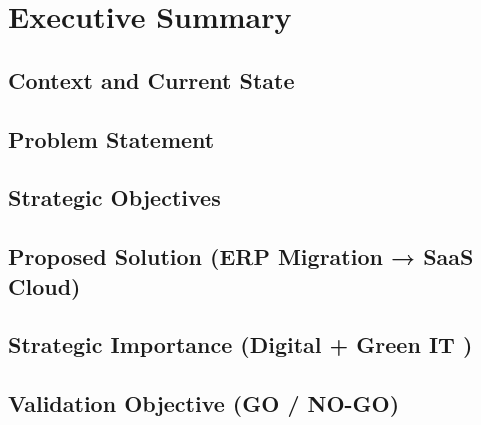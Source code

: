 \chapter{Executive Summary} %
    \section{Context and Current State}
    \section{Problem Statement}
    \section{Strategic Objectives}
    \section{Proposed Solution (ERP Migration → SaaS Cloud)}
    \section{Strategic Importance (Digital + Green IT )}
    \section{Validation Objective (GO / NO-GO)}

